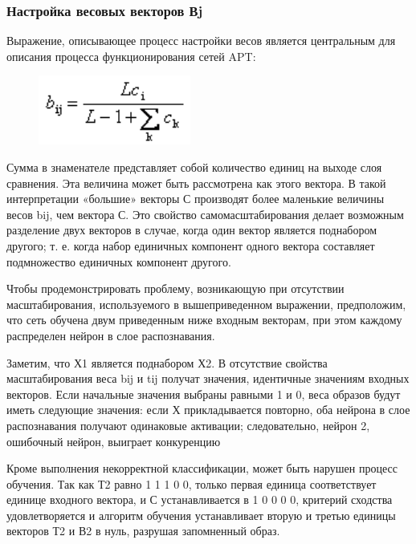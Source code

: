 \documentclass[14pt,a4paper,report]{article}
\begin{document}
\subsubsection{Настройка весовых векторов Вj}

Выражение, описывающее процесс настройки весов является центральным для описания процесса функционирования сетей APT:

\begin{figure}[h!]
	\centering
	\includegraphics[scale = 0.90]{images/f_1.png}
\end{figure}

Сумма в знаменателе представляет собой количество единиц на выходе слоя сравнения. Эта величина может быть рассмотрена как  этого вектора. В такой интерпретации «большие» векторы С производят более маленькие величины весов bij, чем  вектора С. Это свойство самомасштабирования делает возможным разделение двух векторов в случае, когда один вектор является поднабором другого; т. е. когда набор единичных компонент одного вектора составляет подмножество единичных компонент другого.

Чтобы продемонстрировать проблему, возникающую при отсутствии масштабирования, используемого в вышеприведенном выражении, предположим, что сеть обучена двум приведенным ниже входным векторам, при этом каждому распределен нейрон в слое распознавания.

Заметим, что Х1 является поднабором Х2. В отсутствие свойства масштабирования веса bij и tij получат значения, идентичные значениям входных векторов. Если начальные значения выбраны равными 1 и 0, веса образов будут иметь следующие значения: если Х прикладывается повторно, оба нейрона в слое распознавания получают одинаковые активации; следовательно, нейрон 2, ошибочный нейрон, выиграет конкуренцию \cite{cite-techn-adapt}

Кроме выполнения некорректной классификации, может быть нарушен процесс обучения. Так как Т2 равно 1 1 1 0 0, только первая единица соответствует единице входного вектора, и С устанавливается в 1 0 0 0 0, критерий сходства удовлетворяется и алгоритм обучения устанавливает вторую и третью единицы векторов Т2 и В2 в нуль, разрушая запомненный образ.
\end{document}
